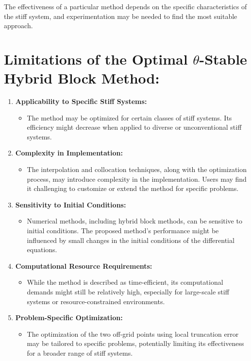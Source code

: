 \documentclass{article}
\begin{document}
The effectiveness of a particular method depends on the specific characteristics of the stiff system, and experimentation may be needed to find the most suitable approach.


\section*{Limitations of the Optimal $\theta$-Stable Hybrid Block Method:}

\begin{enumerate}
    \item \textbf{Applicability to Specific Stiff Systems:}
    \begin{itemize}
        \item The method may be optimized for certain classes of stiff systems. Its efficiency might decrease when applied to diverse or unconventional stiff systems.
    \end{itemize}
    
    \item \textbf{Complexity in Implementation:}
    \begin{itemize}
        \item The interpolation and collocation techniques, along with the optimization process, may introduce complexity in the implementation. Users may find it challenging to customize or extend the method for specific problems.
    \end{itemize}
    
    \item \textbf{Sensitivity to Initial Conditions:}
    \begin{itemize}
        \item Numerical methods, including hybrid block methods, can be sensitive to initial conditions. The proposed method's performance might be influenced by small changes in the initial conditions of the differential equations.
    \end{itemize}
    
    \item \textbf{Computational Resource Requirements:}
    \begin{itemize}
        \item While the method is described as time-efficient, its computational demands might still be relatively high, especially for large-scale stiff systems or resource-constrained environments.
    \end{itemize}
    
    \item \textbf{Problem-Specific Optimization:}
    \begin{itemize}
        \item The optimization of the two off-grid points using local truncation error may be tailored to specific problems, potentially limiting its effectiveness for a broader range of stiff systems.
    \end{itemize}
    

\end{enumerate}
\end{document}
